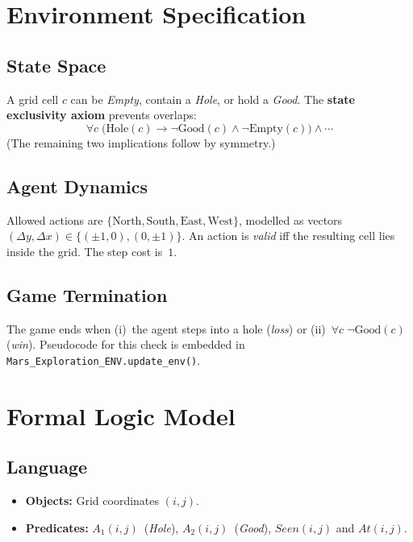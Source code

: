 \documentclass[12pt]{article}
\begin{document}
\section{Environment Specification}\label{sec:environment}
\subsection{State Space}
A grid cell $c$ can be \emph{Empty}, contain a \emph{Hole}, or hold a
\emph{Good}.  The \textbf{state exclusivity axiom} prevents overlaps:
\begin{equation}
\forall c\; \bigl(\text{Hole}(c)\!\rightarrow\!\neg\text{Good}(c)\!\land\!\neg\text{Empty}(c)\bigr)
\land\cdots
\label{eq:exclusivity}
\end{equation}
(The remaining two implications follow by symmetry.)

\subsection{Agent Dynamics}
Allowed actions are $\{\text{North},\text{South},\text{East},\text{West}\}$,
modelled as vectors $(\Delta y,\Delta x)\in\{(\pm1,0),(0,\pm1)\}$.
An action is \emph{valid} iff the resulting cell lies inside the grid.  
The step cost is~$1$.

\subsection{Game Termination}
The game ends when
(i)~the agent steps into a hole (\emph{loss}) or
(ii)~\(\forall c\; \neg \text{Good}(c)\) (\emph{win}).
Pseudocode for this check is embedded in
\texttt{Mars\_Exploration\_ENV.update\_env()}.

\section{Formal Logic Model}\label{sec:logic}
\subsection{Language}
\begin{itemize}
    \item \textbf{Objects:} Grid coordinates $(i,j)$.
    \item \textbf{Predicates:}
          \(A_1(i,j)\)~(\emph{Hole}),
          \(A_2(i,j)\)~(\emph{Good}),
          \(Seen(i,j)\) and \(At(i,j)\).
\end{itemize}
\end{document}
